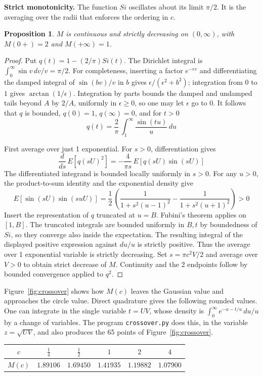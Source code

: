 \documentclass[11pt,a4paper]{article}
\newtheorem{prop}[thm]{Proposition}
\theoremstyle{remark}
\begin{document}
\medskip

\noindent\textbf{Strict monotonicity.} 
The function $Si$ oscillates about its limit $\pi/2$.
It is the averaging over the radii that enforces the ordering in $c$.

\begin{samepage}
\begin{prop}\label{prop:monotone}
$M$ is continuous and strictly decreasing on $(0,\infty)$, with
$M(0+)=2$ and $M(+\infty)=1$.
\end{prop}
\end{samepage}
\begin{proof}
Put $q(t)=1-(2/\pi)Si(t)$. The Dirichlet integral is
$\int_0^\infty \sin v\,dv/v=\pi/2$. For completeness, inserting a
factor $e^{-\epsilon v}$ and differentiating the damped integral of
$\sin(bv)/v$ in $b$ gives $\epsilon/(\epsilon^2+b^2)$; integration from
$0$ to $1$ gives $\arctan(1/\epsilon)$. Integration by parts bounds the
damped and undamped tails beyond $A$ by $2/A$, uniformly in $\epsilon\ge0$,
so one may let $\epsilon$ go to 0. It follows that $q$ is bounded,
$q(0)=1$, $q(\infty)=0$, and for $t>0$
\[
  q(t)=\frac2\pi\,\int_1^\infty\frac{\sin(tu)}u\,du
\]

First average over just 1 exponential. For $s>0$, differentiation gives
\[
 \frac{d}{ds}\,E[q(sU)^2]=-\frac4{\pi s}\,E[q(sU)\sin(sU)]
\]
The differentiated integrand is bounded locally uniformly in $s>0$.
For any $u>0$, the product-to-sum identity and the exponential density give
\[
 E[\sin(sU)\sin(suU)]=\frac12\,
 \left(\frac1{1+s^2(u-1)^2}-\frac1{1+s^2(u+1)^2}\right)>0
\]
Insert the representation of $q$ truncated at $u=B$. Fubini's theorem
applies on $[1,B]$. The truncated integrals are bounded uniformly in
$B,t$ by boundedness of $Si$, so they converge also inside the expectation.
The resulting integral of the displayed positive expression against $du/u$
is strictly positive. Thus the average over 1 exponential variable is strictly
decreasing. Set $s=\pi c^2 V/2$ and average over $V>0$ to obtain strict
decrease of $M$. Continuity and the 2 endpoints follow by bounded
convergence applied to $q^2$.
\end{proof}

Figure~\ref{fig:crossover} shows how $M(c)$ leaves the Gaussian value and
approaches the circle value. Direct quadrature gives the following rounded values.
One can integrate in the single variable $t=UV$, whose density is
$\int_0^\infty e^{-u-t/u}\,du/u$ by a change of variables. The program
\texttt{crossover.py} does this, in the variable $z=\sqrt{UV}$, and also
produces the 65 points of Figure~\ref{fig:crossover}.
\begin{center}
\begin{tabular}{c@{\qquad}ccccc}
\toprule
$c$ & $\frac14$ & $\frac12$ & $1$ & $2$ & $4$\\
\midrule
$M(c)$ & $1.89106$ & $1.69450$ & $1.41935$ & $1.19882$ & $1.07900$\\
\bottomrule
\end{tabular}
\end{center}
\end{document}
